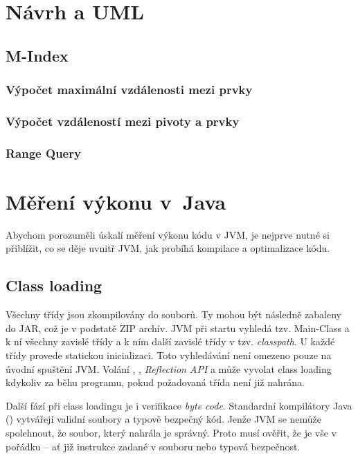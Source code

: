 \section{Návrh a UML}
\subsection{\BPTree}
\subsection{M-Index}
\subsubsection{Výpočet maximální vzdálenosti mezi prvky}
\subsubsection{Výpočet vzdáleností mezi pivoty a prvky}
\subsubsection{Range Query}

\section{Měření výkonu v~Java\label{sec:vykonvjava}}

Abychom porozuměli úskalí měření výkonu kódu v JVM, je nejprve nutné si přiblížit, co se děje uvnitř JVM, jak probíhá kompilace a optimalizace kódu.

\subsection{Class loading}

Všechny třídy jsou zkompilovány do  souborů. Ty mohou být následně zabaleny do JAR, což je v podstatě ZIP archív. JVM při startu vyhledá tzv. Main-Class a k ní všechny zavislé třídy a k ním další zavislé třídy v tzv. \emph{classpath}. U každé třídy provede statickou inicializaci. Toto vyhledávání není omezeno pouze na úvodní spuštění JVM. Volání , , \emph{Reflection API} a  může vyvolat class loading kdykoliv za běhu programu, pokud požadovaná třída není již nahrána\cite{gosling2013java}\cite{lindholm2013java}.

Další fází při class loadingu je i verifikace \emph{byte code}. Standardní kompilátory Java () vytvářejí validní  soubory a typově bezpečný kód. Jenže JVM se nemůže spolehnout, že soubor, který nahrála je správný. Proto musí ověřit, že je vše v pořádku -- ať již instrukce zadané v  souboru nebo typová bezpečnost.

